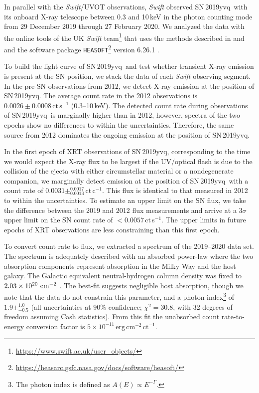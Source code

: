 \documentclass[twocolumn]{aastex63}
\newcommand{\sn}{SN\,2019yvq}
\begin{document}
In parallel with the \textit{Swift}/UVOT observations, \textit{Swift} observed
\sn\ with its onboard X-ray telescope \citep[XRT;][]{Burrows05} between 0.3
and 10\,keV in the photon counting mode from 29 December 2019 through 27
February 2020. We analyzed the data with the online tools of the UK
\textit{Swift}
team\footnote{\href{https://www.swift.ac.uk/user_objects/}{\url{https://www.swift.ac.uk/user_objects/}}} that uses the methods described in \citet{Evans07}
and \citet{Evans09} and the software package \texttt{HEASOFT}\footnote{
\href{https://heasarc.gsfc.nasa.gov/docs/software/heasoft/}{\url{https://heasarc.gsfc.nasa.gov/docs/software/heasoft/}}} version 6.26.1 \citep{Heasarc}.

To build the light curve of \sn\ and test whether transient X-ray emission is
present at the SN position, we stack the data of each \textit{Swift} observing
segment. In the pre-SN observations from 2012, we detect X-ray emission at the
position of \sn. The average count rate in the 2012 observations is
$0.0026\pm0.0008\,\mathrm{ct\,s}^{-1}$ (0.3--10\,keV). The detected count
rate during observations of \sn\ is marginally higher than in 2012, however,
spectra of the two epochs show no differences to within the uncertainties.
Therefore, the same source from 2012 dominates the ongoing emission at the
position of \sn.

In the first epoch of XRT observations of \sn, corresponding to the time we
would expect the X-ray flux to be largest if the UV/optical flash is due to
the collision of the ejecta with either circumstellar material or a
nondegenerate companion, we marginally detect emission at the position of \sn\
with a count rate of $0.0031 \pm^{0.0017}_{0.0013}$\,ct\,c$^{-1}$. This flux
is identical to that measured in 2012 to within the uncertainties. To estimate
an upper limit on the SN flux, we take the difference between the 2019 and
2012 flux measurements and arrive at a $3\sigma$ upper limit on the SN count
rate of $< 0.0057$\,ct\,s$^{-1}$. The upper limits in future epochs of XRT
observations are less constraining than this first epoch.
 
To convert count rate to flux, we extracted a spectrum of the 2019--2020 data
set. The spectrum is adequately described with an absorbed power-law where the
two absorption components represent absorption in the Milky Way and the host
galaxy. The Galactic equivalent neutral-hydrogen column density was fixed to
$2.03\times10^{20}~{\rm cm}^{-2}$ \citep{HI4PI2016a}. The best-fit suggests
negligible host absorption, though we note that the data do not constrain this
parameter, and a photon index\footnote{The photon index is defined as $A(E)
\propto E^{-\Gamma}$.} of $1.9\pm^{1.0}_{-0.5}$ (all uncertainties at 90\%
confidence; $\chi^2=30.8$, with 32 degrees of freedom assuming Cash
statistics). From this fit the unabsorbed count rate-to-energy conversion
factor is $5\times10^{-11}\,\mathrm{erg\,cm}^{-2}\,\mathrm{ct}^{-1}$.
\end{document}
